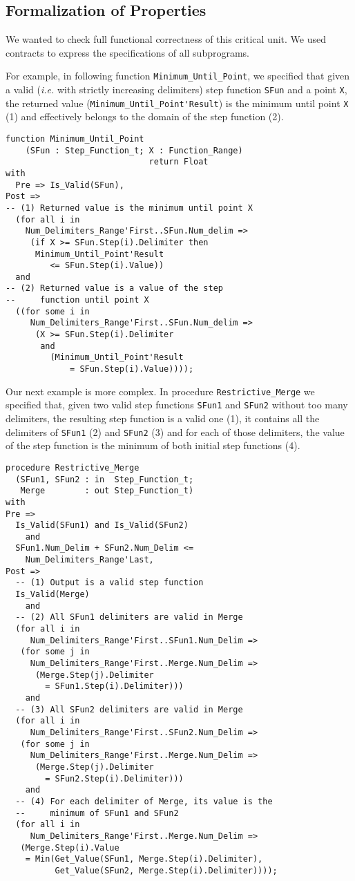 \documentclass[10pt,a4paper,twocolumn]{article}
\newcommand{\ie}{\textit{i.e.}\xspace}
\newcommand{\SPARK}[1]{\lstinline[language=Ada,basicstyle={\footnotesize
      \sffamily},framesep=0pt]$#1$}
\begin{document}
\subsection{Formalization of Properties}

We wanted to check full functional correctness of this critical unit. We used
contracts to express the specifications of all subprograms.

For example, in following function \SPARK{Minimum_Until_Point}, we
specified that given a valid (\ie with strictly increasing delimiters)
step function \SPARK{SFun} and a point \SPARK{X}, the returned value
(\SPARK{Minimum_Until_Point'Result}) is the minimum until point \SPARK{X} (1)
and effectively belongs to the domain of the step function (2).

\begin{lstlisting}
function Minimum_Until_Point
    (SFun : Step_Function_t; X : Function_Range)
                             return Float
with
  Pre => Is_Valid(SFun),
Post =>
-- (1) Returned value is the minimum until point X
  (for all i in
    Num_Delimiters_Range'First..SFun.Num_delim =>
     (if X >= SFun.Step(i).Delimiter then
      Minimum_Until_Point'Result
         <= SFun.Step(i).Value))
  and
-- (2) Returned value is a value of the step
--     function until point X
  ((for some i in
     Num_Delimiters_Range'First..SFun.Num_delim =>
      (X >= SFun.Step(i).Delimiter
       and
         (Minimum_Until_Point'Result
             = SFun.Step(i).Value))));
\end{lstlisting}

Our next example is more complex.
In procedure \SPARK{Restrictive_Merge} we specified that, given two
valid step functions \SPARK{SFun1} and
\SPARK{SFun2} without too many delimiters, the resulting step function is a
valid one (1), it contains all the delimiters of \SPARK{SFun1} (2) and
\SPARK{SFun2} (3) and for each of those delimiters, the value of the step
function is the minimum of both initial step functions (4).

\begin{lstlisting}
procedure Restrictive_Merge
  (SFun1, SFun2 : in  Step_Function_t;
   Merge        : out Step_Function_t)
with
Pre =>
  Is_Valid(SFun1) and Is_Valid(SFun2)
    and
  SFun1.Num_Delim + SFun2.Num_Delim <=
    Num_Delimiters_Range'Last,
Post =>
  -- (1) Output is a valid step function
  Is_Valid(Merge)
    and
  -- (2) All SFun1 delimiters are valid in Merge
  (for all i in
     Num_Delimiters_Range'First..SFun1.Num_Delim =>
   (for some j in
     Num_Delimiters_Range'First..Merge.Num_Delim =>
      (Merge.Step(j).Delimiter
        = SFun1.Step(i).Delimiter)))
    and
  -- (3) All SFun2 delimiters are valid in Merge
  (for all i in
     Num_Delimiters_Range'First..SFun2.Num_Delim =>
   (for some j in
     Num_Delimiters_Range'First..Merge.Num_Delim =>
      (Merge.Step(j).Delimiter
        = SFun2.Step(i).Delimiter)))
    and
  -- (4) For each delimiter of Merge, its value is the
  --     minimum of SFun1 and SFun2
  (for all i in
     Num_Delimiters_Range'First..Merge.Num_Delim =>
   (Merge.Step(i).Value
    = Min(Get_Value(SFun1, Merge.Step(i).Delimiter),
          Get_Value(SFun2, Merge.Step(i).Delimiter))));
\end{lstlisting}
\end{document}
